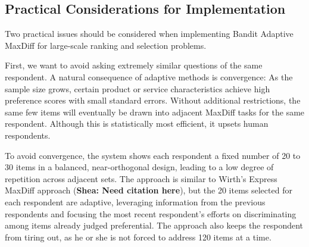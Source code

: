 \documentclass[a4paper,11pt]{article}
\newcommand{\numperset}{L}
\begin{document}
\subsection*{Practical Considerations for Implementation}



Two practical issues should be considered when implementing Bandit Adaptive MaxDiff for large-scale ranking and selection problems. 

First, we want to avoid asking extremely similar questions of the same respondent. A natural consequence of adaptive methods is convergence: As the sample size grows, certain product or service characteristics achieve high preference scores with small standard errors. Without additional restrictions, the same few items will eventually be drawn into adjacent MaxDiff tasks for the same respondent. Although this is statistically most efficient, it upsets human respondents. 

To avoid convergence, the system shows each respondent a fixed number of 20 to 30 items in a balanced, near-orthogonal design, leading to a low degree of repetition across adjacent sets. The approach is similar to Wirth's Express MaxDiff approach (\textbf{Shea: Need citation here}), but the 20 items selected for each respondent are adaptive, leveraging information from the previous respondents and focusing the most recent respondent's efforts on discriminating among items already judged preferential. The approach also keeps the respondent from tiring out, as he or she is not forced to address 120 items at a time.
\end{document}
